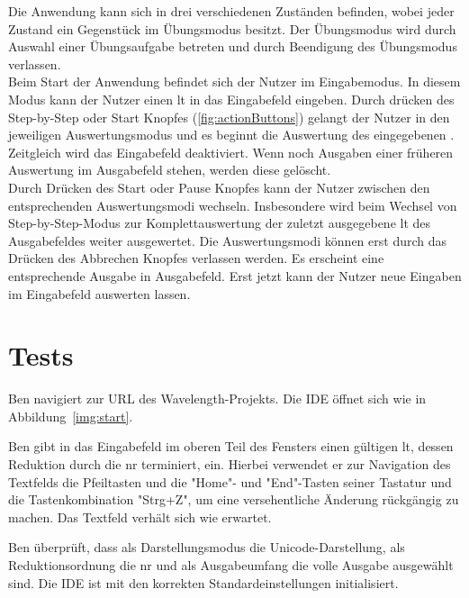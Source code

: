 \documentclass[parskip=full,11pt,twoside]{scrartcl}
\begin{document}
Die Anwendung kann sich in drei verschiedenen Zuständen befinden, wobei jeder Zustand ein Gegenstück im Übungsmodus besitzt. 
Der Übungsmodus wird durch Auswahl einer Übungsaufgabe betreten und durch Beendigung des Übungsmodus verlassen.\\
Beim Start der Anwendung befindet sich der Nutzer im Eingabemodus. In diesem Modus kann der Nutzer einen \gls{lt} in das Eingabefeld eingeben. 
Durch drücken des Step-by-Step oder Start Knopfes (\cref{fig:actionButtons}) gelangt der Nutzer in den jeweiligen Auswertungsmodus und es beginnt die Auswertung des eingegebenen . 
Zeitgleich wird das Eingabefeld deaktiviert. Wenn noch Ausgaben einer früheren Auswertung im Ausgabefeld stehen, werden diese gelöscht.\\ 
Durch Drücken des Start oder Pause Knopfes kann der Nutzer zwischen den entsprechenden Auswertungsmodi wechseln. 
Insbesondere wird beim Wechsel von Step-by-Step-Modus zur Komplettauswertung der zuletzt ausgegebene \gls{lt} des Ausgabefeldes weiter ausgewertet.
Die Auswertungsmodi können erst durch das Drücken des Abbrechen Knopfes verlassen werden. Es erscheint eine entsprechende Ausgabe in Ausgabefeld. Erst jetzt kann der Nutzer neue Eingaben im Eingabefeld auswerten lassen.


\section{Tests}


{Ben navigiert zur URL des Wavelength-Projekts.}
{Die IDE öffnet sich wie in Abbildung~\ref{img:start}.}

{Ben gibt in das Eingabefeld im oberen Teil des Fensters einen gültigen \gls{lt},
dessen Reduktion durch die \gls{nr} terminiert, ein.
Hierbei verwendet er zur Navigation des Textfelds die Pfeiltasten und die
"Home"- und "End"-Tasten seiner Tastatur und die Tastenkombination "Strg+Z", um eine
versehentliche Änderung rückgängig zu machen.}
{Das Textfeld verhält sich wie erwartet.}

{Ben überprüft, dass als Darstellungsmodus die Unicode-Darstellung, als Reduktionsordnung
die \gls{nr} und als Ausgabeumfang die volle Ausgabe ausgewählt sind.}
{Die IDE ist mit den korrekten Standardeinstellungen initialisiert.}
\end{document}
